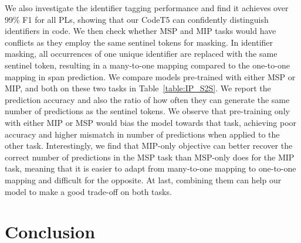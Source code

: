 \documentclass[11pt]{article}
\begin{document}
\begin{table}[t]
\centering
{}
\vspace{-1mm}
\caption{Compare MSP and MIP  on a subset of Java in CodeSearchNet.  ``\#Pred M'' denotes the ratio of prediction numbers that matches the sentinel token numbers.}

\label{table:IP_S2S}
\vspace{-1mm}
\end{table}

 
We also investigate the identifier tagging performance and find it achieves  over 99\% F1 for all PLs, showing that our CodeT5 can confidently distinguish  identifiers in code. We then check whether MSP and MIP tasks would have conflicts as they employ the same sentinel tokens for masking.
In identifier masking, all occurrences of one unique identifier are replaced with the same sentinel token, resulting in a many-to-one mapping compared to the one-to-one mapping in span prediction.
We compare  models pre-trained with either MSP or MIP, and both on these two tasks in Table~\ref{table:IP_S2S}. 
We report the prediction accuracy and also the ratio of how often they can generate the same number of predictions as the sentinel tokens. We observe that pre-training only with either MIP or MSP would bias the model towards that task, achieving poor accuracy and higher mismatch in number of predictions when applied to the other task.
Interestingly, we find that MIP-only objective can better recover the correct number of predictions in the MSP task than MSP-only does for the MIP task, meaning that it is easier to adapt from   many-to-one mapping  to  one-to-one mapping and difficult for the opposite.
At last, combining them can help our model to make a good trade-off on both tasks.

 \section{Conclusion}
\end{document}
